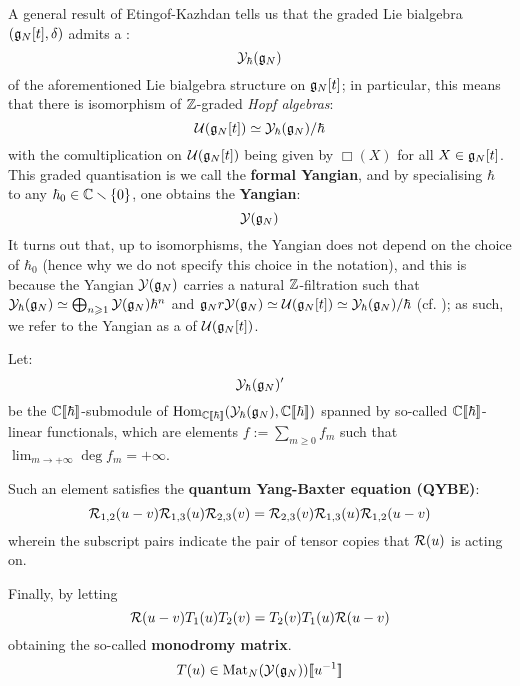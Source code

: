         A general result of Etingof-Kazhdan tells us that the graded Lie bialgebra $(\mathfrak{g}_N[t], \delta)$ admits a :
            $$\mathcal{Y}_{\hbar}(\mathfrak{g}_N)$$
        of the aforementioned Lie bialgebra structure on $\mathfrak{g}_N[t]$; in particular, this means that there is isomorphism of $\mathbb{Z}$-graded \textit{Hopf algebras}:
            $$\mathcal{U}(\mathfrak{g}_N[t]) \simeq \mathcal{Y}_{\hbar}(\mathfrak{g}_N)/\hbar$$
        with the comultiplication on $\mathcal{U}(\mathfrak{g}_N[t])$ being given by $\Box(X)$ for all $X \in \mathfrak{g}_N[t]$. This graded quantisation is we call the \textbf{formal Yangian}, and by specialising $\hbar$ to any $\hbar_0 \in \mathbb{C} \smallsetminus \{0\}$, one obtains the \textbf{Yangian}:
            $$\mathcal{Y}(\mathfrak{g}_N)$$
        It turns out that, up to isomorphisms, the Yangian does not depend on the choice of $\hbar_0$ (hence why we do not specify this choice in the notation), and this is because the Yangian $\mathcal{Y}(\mathfrak{g}_N)$ carries a natural $\mathbb{Z}$-filtration such that $\mathcal{Y}_{\hbar}(\mathfrak{g}_N) \simeq \bigoplus_{n \geqslant 1} \mathcal{Y}(\mathfrak{g}_N) \hbar^n$ and $\mathfrak{g}_Nr \mathcal{Y}(\mathfrak{g}_N) \simeq \mathcal{U}(\mathfrak{g}_N[t]) \simeq \mathcal{Y}_{\hbar}(\mathfrak{g}_N)/\hbar$ (cf. \cite{drinfeld_original_yangian_paper}); as such, we refer to the Yangian as a  of $\mathcal{U}(\mathfrak{g}_N[t])$.

        Let:
            $$\mathcal{Y}_{\hbar}(\mathfrak{g}_N)'$$
        be the $\mathbb{C}[\![\hbar]\!]$-submodule of $\operatorname{Hom}_{\mathbb{C}[\![\hbar]\!]}( \mathcal{Y}_{\hbar}(\mathfrak{g}_N), \mathbb{C}[\![\hbar]\!] )$ spanned by so-called  $\mathbb{C}[\![\hbar]\!]$-linear functionals, which are elements $f := \sum_{m \geq 0} f_m$ such that $\lim_{m \to +\infty} \deg f_m = +\infty$.
            
        Such an element satisfies the \textbf{quantum Yang-Baxter equation (QYBE)}:
            \begin{equation} \label{equation: additive_spectral_QYBE}
                \mathcal{R}_{1, 2}(u - v) \mathcal{R}_{1, 3}(u) \mathcal{R}_{2, 3}(v) = \mathcal{R}_{2, 3}(v) \mathcal{R}_{1, 3}(u) \mathcal{R}_{1, 2}(u - v)
            \end{equation}
        wherein the subscript pairs indicate the pair of tensor copies that $\mathcal{R}(u)$ is acting on.

        Finally, by letting 
            \begin{equation} \label{equation: spectral_RTT_relation}
                \mathcal{R}(u - v) T_1(u) T_2(v) = T_2(v) T_1(u) \mathcal{R}(u - v)
            \end{equation}
        obtaining the so-called \textbf{monodromy matrix}.
            $$T(u) \in \operatorname{Mat}_N( \mathcal{Y}(\mathfrak{g}_N) )[\![u^{-1}]\!]$$
    
